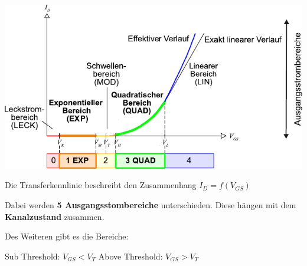 \begin{minipage}[t]{0.55\columnwidth}
    \includegraphics[width=\columnwidth, align=t]{images/02_MOSFET_transferkennlinie.pdf}
\end{minipage}
\hfill
\begin{minipage}[t]{0.42\columnwidth}
    Die Transferkennlinie beschreibt den Zusammenhang $I_D = f(V_{GS})$ 

    \smallskip

    Dabei werden \textbf{5 Ausgangsstombereiche} unterschieden. Diese hängen mit dem \textbf{Kanalzustand} zusammen.

    \smallskip

    Des Weiteren gibt es die Bereiche:

    \begin{outline}
        \1 Sub Threshold: $V_{GS} < V_T$
        \1 Above Threshold: $V_{GS} > V_T$
    \end{outline}
\end{minipage}



